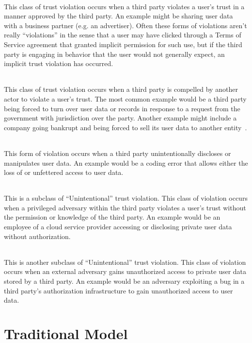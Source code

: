 \begin{packed_desc}
\item[Implicit (P):] \hfill \\ This class of trust violation occurs
  when a third party violates a user's trust in a manner approved by
  the third party. An example might be sharing user data with a
  business partner (e.g. an advertiser). Often these forms of
  violations aren't really ``violations'' in the sense that a user may
  have clicked through a Terms of Service agreement that granted
  implicit permission for such use, but if the third party is engaging
  in behavior that the user would not generally expect, an implicit
  trust violation has occurred.
\item[Compelled (C):] \hfill \\ This class of trust violation occurs
  when a third party is compelled by another actor to violate a user's
  trust. The most common example would be a third party being forced
  to turn over user data or records in response to a request from the
  government with jurisdiction over the party. Another example might
  include a company going bankrupt and being forced to sell its user
  data to another entity~\cite{solove2015}.
\item[Unintentional (U):] \hfill \\ This form of violation occurs when
  a third party unintentionally discloses or manipulates user data. An
  example would be a coding error that allows either the loss of or
  unfettered access to user data.
\item[Insider (I):] \hfill \\ This is a subclass of ``Unintentional''
  trust violation. This class of violation occurs when a privileged
  adversary within the third party violates a user's trust without the
  permission or knowledge of the third party. An example would be an
  employee of a cloud service provider accessing or disclosing private
  user data without authorization.
\item[Outsider (O):] \hfill \\ This is another subclass of
  ``Unintentional'' trust violation. This class of violation occurs
  when an external adversary gains unauthorized access to private user
  data stored by a third party. An example would be an adversary
  exploiting a bug in a third party's authorization infrastructure to
  gain unauthorized access to user data.
\end{packed_desc}

\section{Traditional Model}
\label{chap:trust:traditional}

